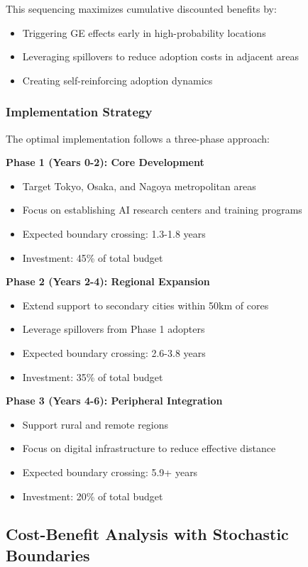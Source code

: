 This sequencing maximizes cumulative discounted benefits by:
\begin{itemize}
   \item Triggering GE effects early in high-probability locations
   \item Leveraging spillovers to reduce adoption costs in adjacent areas
   \item Creating self-reinforcing adoption dynamics
\end{itemize}

\subsubsection{Implementation Strategy}

The optimal implementation follows a three-phase approach:

\textbf{Phase 1 (Years 0-2): Core Development}
\begin{itemize}
   \item Target Tokyo, Osaka, and Nagoya metropolitan areas
   \item Focus on establishing AI research centers and training programs
   \item Expected boundary crossing: 1.3-1.8 years
   \item Investment: 45\% of total budget
\end{itemize}

\textbf{Phase 2 (Years 2-4): Regional Expansion}
\begin{itemize}
   \item Extend support to secondary cities within 50km of cores
   \item Leverage spillovers from Phase 1 adopters
   \item Expected boundary crossing: 2.6-3.8 years
   \item Investment: 35\% of total budget
\end{itemize}

\textbf{Phase 3 (Years 4-6): Peripheral Integration}
\begin{itemize}
   \item Support rural and remote regions
   \item Focus on digital infrastructure to reduce effective distance
   \item Expected boundary crossing: 5.9+ years
   \item Investment: 20\% of total budget
\end{itemize}

\subsection{Cost-Benefit Analysis with Stochastic Boundaries}

